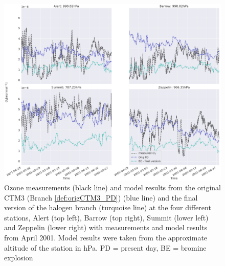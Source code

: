 \begin{figure}[h]
    \centering
    \includegraphics[width = \linewidth]{Chapter6_Results/images/ozone_stationComp_2001/ozone_2001_AprMay_step5.png}
    \caption{Ozone measurements (black line) and model results from the original CTM3 (Branch \ref{def:origCTM3_PD}) (blue line) and the final version of the halogen branch (turquoise line) at the four different stations, Alert (top left), Barrow (top right), Summit (lower left) and Zeppelin (lower right) with measurements and model results from April 2001. Model results were taken from the approximate altitude of the station in hPa. PD = present day, BE = bromine explosion}
    \label{fig:AprMar_step5}
\end{figure}